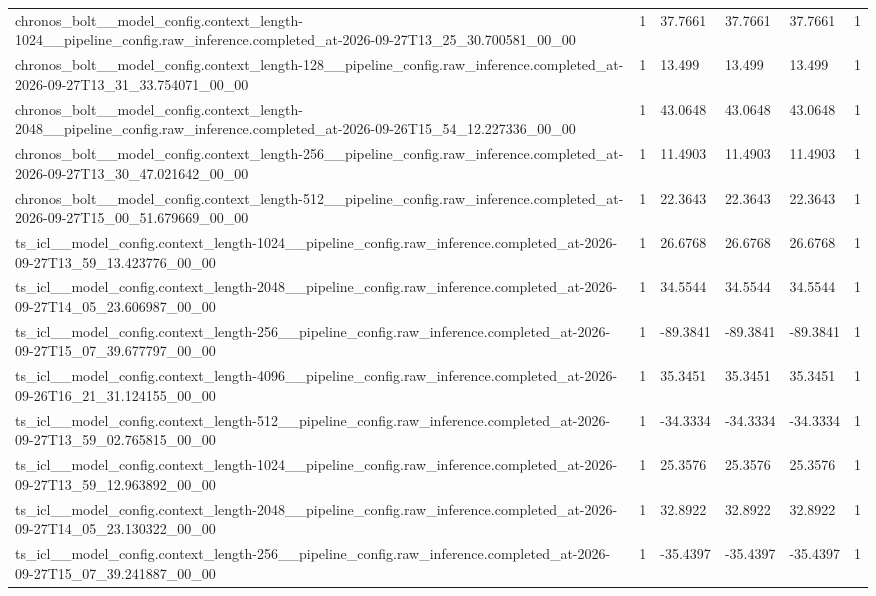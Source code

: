 \begin{tabular}{llllll}
chronos\_bolt\_\_model\_config.context\_length-1024\_\_pipeline\_config.raw\_inference.completed\_at-2026-09-27T13\_25\_30.700581\_00\_00 & 1 & 37.7661 & 37.7661 & 37.7661 & 1 \\
chronos\_bolt\_\_model\_config.context\_length-128\_\_pipeline\_config.raw\_inference.completed\_at-2026-09-27T13\_31\_33.754071\_00\_00 & 1 & 13.499 & 13.499 & 13.499 & 1 \\
chronos\_bolt\_\_model\_config.context\_length-2048\_\_pipeline\_config.raw\_inference.completed\_at-2026-09-26T15\_54\_12.227336\_00\_00 & 1 & 43.0648 & 43.0648 & 43.0648 & 1 \\
chronos\_bolt\_\_model\_config.context\_length-256\_\_pipeline\_config.raw\_inference.completed\_at-2026-09-27T13\_30\_47.021642\_00\_00 & 1 & 11.4903 & 11.4903 & 11.4903 & 1 \\
chronos\_bolt\_\_model\_config.context\_length-512\_\_pipeline\_config.raw\_inference.completed\_at-2026-09-27T15\_00\_51.679669\_00\_00 & 1 & 22.3643 & 22.3643 & 22.3643 & 1 \\
ts\_icl\_\_model\_config.context\_length-1024\_\_pipeline\_config.raw\_inference.completed\_at-2026-09-27T13\_59\_13.423776\_00\_00 & 1 & 26.6768 & 26.6768 & 26.6768 & 1 \\
ts\_icl\_\_model\_config.context\_length-2048\_\_pipeline\_config.raw\_inference.completed\_at-2026-09-27T14\_05\_23.606987\_00\_00 & 1 & 34.5544 & 34.5544 & 34.5544 & 1 \\
ts\_icl\_\_model\_config.context\_length-256\_\_pipeline\_config.raw\_inference.completed\_at-2026-09-27T15\_07\_39.677797\_00\_00 & 1 & -89.3841 & -89.3841 & -89.3841 & 1 \\
ts\_icl\_\_model\_config.context\_length-4096\_\_pipeline\_config.raw\_inference.completed\_at-2026-09-26T16\_21\_31.124155\_00\_00 & 1 & 35.3451 & 35.3451 & 35.3451 & 1 \\
ts\_icl\_\_model\_config.context\_length-512\_\_pipeline\_config.raw\_inference.completed\_at-2026-09-27T13\_59\_02.765815\_00\_00 & 1 & -34.3334 & -34.3334 & -34.3334 & 1 \\
ts\_icl\_\_model\_config.context\_length-1024\_\_pipeline\_config.raw\_inference.completed\_at-2026-09-27T13\_59\_12.963892\_00\_00 & 1 & 25.3576 & 25.3576 & 25.3576 & 1 \\
ts\_icl\_\_model\_config.context\_length-2048\_\_pipeline\_config.raw\_inference.completed\_at-2026-09-27T14\_05\_23.130322\_00\_00 & 1 & 32.8922 & 32.8922 & 32.8922 & 1 \\
ts\_icl\_\_model\_config.context\_length-256\_\_pipeline\_config.raw\_inference.completed\_at-2026-09-27T15\_07\_39.241887\_00\_00 & 1 & -35.4397 & -35.4397 & -35.4397 & 1 \\

\end{tabular}
